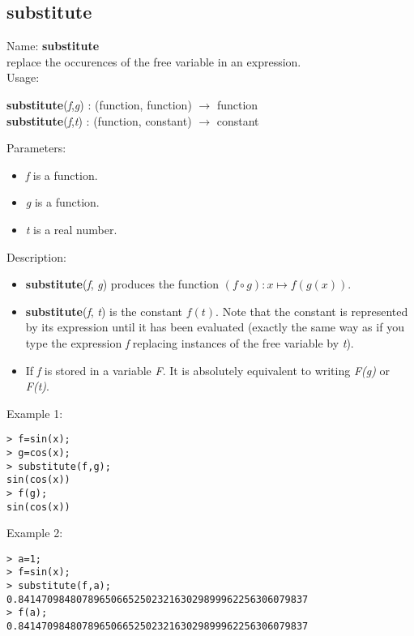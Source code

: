 \subsection{substitute}
\label{labsubstitute}
\noindent Name: \textbf{substitute}\\
replace the occurences of the free variable in an expression.\\

\noindent Usage: 
\begin{center}
\textbf{substitute}(\emph{f},\emph{g}) : (\textsf{function}, \textsf{function}) $\rightarrow$ \textsf{function}\\
\textbf{substitute}(\emph{f},\emph{t}) : (\textsf{function}, \textsf{constant}) $\rightarrow$ \textsf{constant}\\
\end{center}
Parameters: 
\begin{itemize}
\item \emph{f} is a function.
\item \emph{g} is a function.
\item \emph{t} is a real number.
\end{itemize}
\noindent Description: \begin{itemize}

\item \textbf{substitute}(\emph{f}, \emph{g}) produces the function $(f \circ g) : x \mapsto f(g(x))$.

\item \textbf{substitute}(\emph{f}, \emph{t}) is the constant $f(t)$. Note that the constant is
   represented by its expression until it has been evaluated (exactly the same
   way as if you type the expression \emph{f} replacing instances of the free variable 
   by \emph{t}).

\item If \emph{f} is stored in a variable \emph{F}. It is absolutely equivalent to 
   writing \emph{F(g)} or \emph{F(t)}.
\end{itemize}
\noindent Example 1: 
\begin{center}\begin{minipage}{15cm}\begin{Verbatim}[frame=single]
> f=sin(x);
> g=cos(x);
> substitute(f,g);
sin(cos(x))
> f(g);
sin(cos(x))
\end{Verbatim}
\end{minipage}\end{center}
\noindent Example 2: 
\begin{center}\begin{minipage}{15cm}\begin{Verbatim}[frame=single]
> a=1;
> f=sin(x);
> substitute(f,a);
0.84147098480789650665250232163029899962256306079837
> f(a);
0.84147098480789650665250232163029899962256306079837
\end{Verbatim}
\end{minipage}\end{center}
